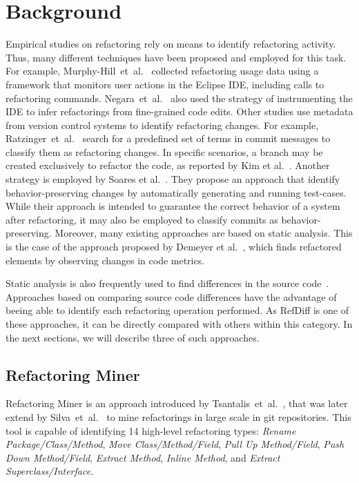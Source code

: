 \section{Background}
\label{SecBackground}

Empirical studies on refactoring rely on means to identify refactoring activity. Thus, many different techniques have been proposed and employed for this task.
For example, Murphy-Hill~et~al.~\cite{MurphyHill2012} collected refactoring usage data using a framework that monitors user actions in the Eclipse IDE, including calls to refactoring commands.
Negara~et~al.~\cite{negara2013} also used the strategy of instrumenting the IDE to infer refactorings from fine-grained code edits.
Other studies use metadata from version control systems to identify refactoring changes. For example, Ratzinger~et~al.~\cite{ratzinger2008relation} search for a predefined set of terms in commit messages to classify them as refactoring changes. In specific scenarios, a branch may be created exclusively to refactor the code, as reported by Kim et al.~\cite{kim-tse-2014}.
Another strategy is employed by Soares et al.~\cite{soares2010making}. They propose an approach that identify behavior-preserving changes by automatically generating and running test-cases. While their approach is intended to guarantee the correct behavior of a system after refactoring, it may also be employed to classify commits as behavior-preserving.
Moreover, many existing approaches are based on static analysis.
This is the case of the approach proposed by Demeyer et al.~\cite{demeyer2000finding}, which finds refactored elements by observing changes in code metrics.

Static analysis is also frequently used to find differences in the source code~\cite{dig2006automated, weissgerber2006identifying, tsantalis_empiricalstudy,prete2010template,Kim:2010:RefFinder}.
Approaches based on comparing source code differences have the advantage of beeing able to identify each refactoring operation performed. As RefDiff is one of these approaches, it can be directly compared with others within this category. In the next sections, we will describe three of such approaches.


\subsection{Refactoring Miner}

Refactoring Miner is an approach introduced by Tsantalis~et~al.~\cite{tsantalis_empiricalstudy}, that was later extend by Silva~et~al.~\cite{fse2016-why-we-refactor} to mine refactorings in large scale in git repositories. This tool is capable of identifying 14 high-level refactoring types: \emph{Rename Package/Class/Method}, \emph{Move Class/Method/Field}, \emph{Pull Up Method/Field}, \emph{Push Down Method/Field}, \emph{Extract Method}, \emph{Inline Method}, 
and \emph{Extract Superclass/Interface}.

